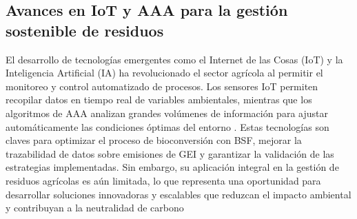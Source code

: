 \subsection{Avances en IoT y AAA para la gestión sostenible de residuos}

El desarrollo de tecnologías emergentes como el Internet de las Cosas (IoT) y la Inteligencia Artificial (IA) ha revolucionado el sector agrícola al permitir el monitoreo y control automatizado de procesos. Los sensores IoT permiten recopilar datos en tiempo real de variables ambientales, mientras que los algoritmos de AAA analizan grandes volúmenes de información para ajustar automáticamente las condiciones óptimas del entorno \parencite{kamilaris2017review}. Estas tecnologías son claves para optimizar el proceso de bioconversión con BSF, mejorar la trazabilidad de datos sobre emisiones de GEI y garantizar la validación de las estrategias implementadas. Sin embargo, su aplicación integral en la gestión de residuos agrícolas es aún limitada, lo que representa una oportunidad para desarrollar soluciones innovadoras y escalables que reduzcan el impacto ambiental y contribuyan a la neutralidad de carbono \parencite{IPCC2014}